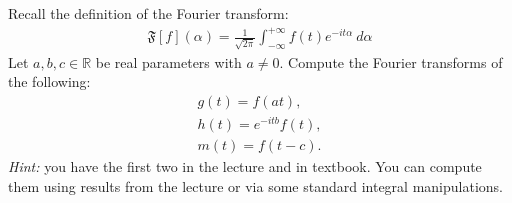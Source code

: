 \documentclass[11pt]{article}
\begin{document}
\begin{exercise}
    Recall the definition of the Fourier transform:
    \begin{align}
        \mathfrak{F}[f](\alpha) = \frac{1}{\sqrt{2\pi}} \int_{-\infty}^{+\infty} f(t) e^{-it\alpha} \ d\alpha
    \end{align}
    Let $a,b,c \in \mathbb R$ be real parameters with $a \neq 0$. Compute the Fourier transforms of the following:
    \begin{align}
        g(t) = f( a t ),
        \\
        h(t) = e^{-i t b} f(t),
        \\
        m(t) = f( t - c ).
    \end{align}
    \textit{Hint: } you have the first two in the lecture and in textbook. You can compute them using results from the lecture or via some standard integral manipulations. 
\end{exercise}
\end{document}
